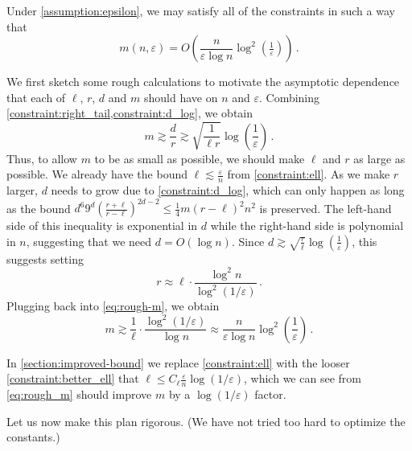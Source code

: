 \documentclass{theoretics}
\renewcommand{\epsilon}{\varepsilon}
\begin{document}
\begin{proposition}
    \label{res:optimization}
    Under \cref{assumption:epsilon}, we may satisfy all of the
    constraints in such a way that
    \[
        m(n,\epsilon)
        = O\left( \frac{n}{\epsilon \log n} \log^2\left(\tfrac{1}{\epsilon}\right) \right) \,.
    \]
\end{proposition}

    We first sketch some rough calculations to motivate the asymptotic dependence that each of
    $\ell$, $r$, $d$ and $m$ should have on $n$ and $\epsilon$. Combining
    \cref{constraint:right_tail,constraint:d_log}, we obtain
    \begin{equation}
        \label{eq:rough-m}
        m \gtrsim \frac{d}{r} \gtrsim \sqrt{\frac{1}{\ell r}} \log\left(\frac{1}{\epsilon}\right)
        \,.
    \end{equation}
    Thus, to allow $m$ to be as small as possible, we should make $\ell$ and $r$ as large as
    possible. We already have the bound $\ell \lesssim \frac{\epsilon}{n}$ from
    \cref{constraint:ell}. As we make $r$ larger, $d$ needs to grow due to \cref{constraint:d_log},
    which can only happen as long as the bound
    $d^6 9^d \left(\frac{r+\ell}{r-\ell}\right)^{2d-2} \leq \tfrac{1}{4} m(r-\ell)^2 n^2$ is
    preserved. The left-hand side of this inequality is exponential in $d$ while
    the right-hand side is polynomial in $n$, suggesting that we need $d = O(\log n)$. Since $d
    \gtrsim \sqrt{\frac{r}{\ell}} \log\left(\frac{1}{\epsilon}\right)$, this suggests setting
    \[
        r \approx \ell \cdot \frac{\log^2 n}{\log^2(1/\epsilon)} \,.
    \]
    Plugging back into \eqref{eq:rough-m}, we obtain
    \begin{equation}
    \label{eq:rough_m}
        m \gtrsim \frac{1}{\ell} \cdot \frac{\log^2(1/\epsilon)}{\log n}
        \approx \frac{n}{\epsilon \log n} \log^2\left(\frac{1}{\epsilon}\right) \,.
    \end{equation}
    \begin{remark}
      In \cref{section:improved-bound} we replace \cref{constraint:ell} with the looser
      \cref{constraint:better_ell} that $\ell \leq C_\ell \tfrac{\epsilon}{n} \log(1/\epsilon)$, which we
      can see from \cref{eq:rough_m} should improve $m$ by a $\log(1/\epsilon)$ factor.
    \end{remark}
    Let us now make this plan rigorous. (We have not tried too hard to optimize the constants.)
\end{document}
